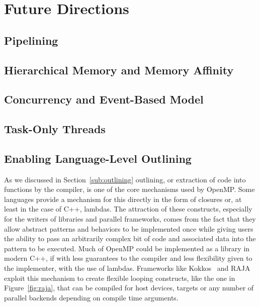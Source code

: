 \section{Future Directions}
\label{sec:future_directions}

\subsection{Pipelining}
\label{sub:pipelining}

\subsection{Hierarchical Memory and Memory Affinity}
\label{sub:hierarchical_memory_and_memory_affinity}

\subsection{Concurrency and Event-Based Model}
\label{sub:concurrency_and_event_based_model}

\subsection{Task-Only Threads}
\label{sub:task_only_threads}


\subsection{Enabling Language-Level Outlining}
\label{sub:enabling_language_level_outlining}

As we discussed in Section~\ref{sub:outlining} outlining, or extraction of code
into functions by the compiler, is one of the core mechanisms used by OpenMP.
Some languages provide a mechanism for this directly in the form of closures or,
at least in the case of C++, lambdas.  The attraction of these constructs,
especially for the writers of libraries and parallel frameworks, comes from the
fact that they allow abstract patterns and behaviors to be implemented once
while giving users the ability to pass an arbitrarily complex bit of code and
associated data into the pattern to be executed.  Much of OpenMP could be
implemented as a library in modern C++, if with less guarantees to the compiler
and less flexibility given to the implementer, with the use of lambdas.
Frameworks like Kokkos~\cite{kokkos} and RAJA~\cite{raja} exploit this mechanism
to create flexible looping constructs, like the one in Figure~\ref{fig:raja},
that can be compiled for host devices, targets or any number of parallel
backends depending on compile time arguments.

